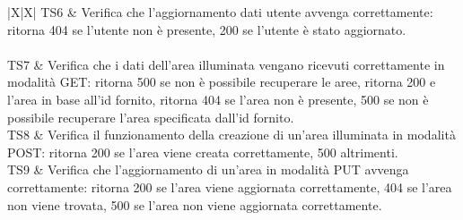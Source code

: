 \documentclass[a4paper, 12pt]{article}
\begin{document}
\begin{center}
\begin{tabularx}{\textwidth}{|X|X|}
		\hline
		TS6             & Verifica che l'aggiornamento dati utente avvenga correttamente: ritorna 404 se l'utente non è presente, 200 se l'utente è stato aggiornato.                                                                                                                                                          \\
		\hline
		                                                                                                                                                                                                                                                               \\
		\hline
		TS7             & Verifica che i dati dell'area illuminata vengano ricevuti correttamente in modalità GET: ritorna 500 se non è possibile recuperare le aree, ritorna 200 e l'area in base all'id fornito, ritorna 404 se l'area non è presente, 500 se non è possibile recuperare l'area specificata dall'id fornito. \\
		\hline
		TS8             & Verifica il funzionamento della creazione di un'area illuminata in modalità POST: ritorna 200 se l'area viene creata correttamente, 500 altrimenti.                                                                                                                                                  \\
		\hline
		TS9             & Verifica che l'aggiornamento di un'area in modalità PUT avvenga correttamente: ritorna 200 se l'area viene aggiornata correttamente, 404 se l'area non viene trovata, 500 se l'area non viene aggiornata correttamente.                                                                              \\
		\hline
	\end{tabularx}\\[8pt]
	\mbox{}\\
\end{center}
\end{document}

